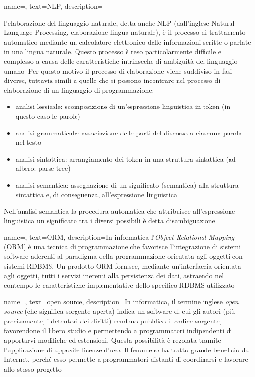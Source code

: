{
    name=,
    text=NLP,
    description={l'elaborazione del linguaggio naturale, detta anche NLP (dall'inglese Natural Language Processing, elaborazione lingua naturale), è il processo di trattamento automatico mediante un calcolatore elettronico delle informazioni scritte o parlate in una lingua naturale. Questo processo è reso particolarmente difficile e complesso a causa delle caratteristiche intrinseche di ambiguità del linguaggio umano. Per questo motivo il processo di elaborazione viene suddiviso in fasi diverse, tuttavia simili a quelle che si possono incontrare nel processo di elaborazione di un linguaggio di programmazione:
\begin{itemize}
 	\item analisi lessicale: scomposizione di un'espressione linguistica in token (in questo caso le parole)
 	\item analisi grammaticale: associazione delle parti del discorso a ciascuna parola nel testo
 	\item analisi sintattica: arrangiamento dei token in una struttura sintattica (ad albero: parse tree)
 	\item analisi semantica: assegnazione di un significato (semantica) alla struttura sintattica e, di conseguenza, all'espressione linguistica
\end{itemize}
Nell'analisi semantica la procedura automatica che attribuisce all'espressione linguistica un significato tra i diversi possibili è detta disambiguazione}
}

{
    name=,
    text=ORM,
    description={In informatica l'\emph{Object-Relational Mapping} (ORM) è una tecnica di programmazione che favorisce l'integrazione di sistemi software aderenti al paradigma della programmazione orientata agli oggetti con sistemi RDBMS.
Un prodotto ORM fornisce, mediante un'interfaccia orientata agli oggetti, tutti i servizi inerenti alla persistenza dei dati, astraendo nel contempo le caratteristiche implementative dello specifico RDBMS utilizzato}
}

{
    name=,
    text=open source,
    description={In informatica, il termine inglese \emph{open source} (che significa sorgente aperta) indica un software di cui gli autori (più precisamente, i detentori dei diritti) rendono pubblico il codice sorgente, favorendone il libero studio e permettendo a programmatori indipendenti di apportarvi modifiche ed estensioni. Questa possibilità è regolata tramite l'applicazione di apposite licenze d'uso. Il fenomeno ha tratto grande beneficio da Internet, perché esso permette a programmatori distanti di coordinarsi e lavorare allo stesso progetto}
}

